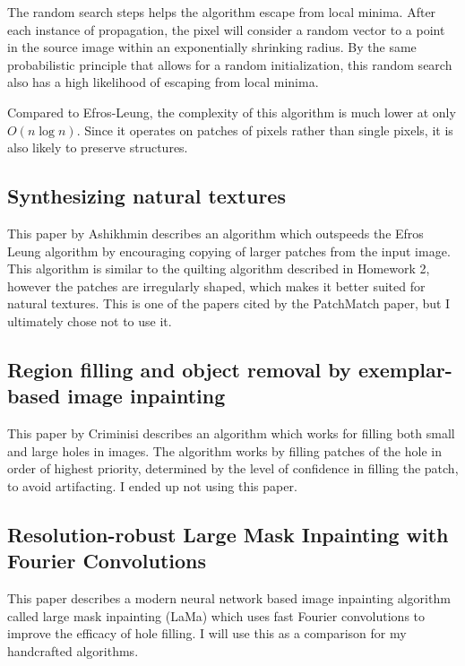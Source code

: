 The random search steps helps the algorithm escape from local minima. After each instance of propagation, the pixel will consider a random vector to a point in the source image within an exponentially shrinking radius. By the same probabilistic principle that allows for a random initialization, this random search also has a high likelihood of escaping from local minima.

Compared to Efros-Leung, the complexity of this algorithm is much lower at only $O(n\log n)$. Since it operates on patches of pixels rather than single pixels, it is also likely to preserve structures.
\subsection*{Synthesizing natural textures \cite{ashikhmin2001synthesizing}}
This paper by Ashikhmin describes an algorithm which outspeeds the Efros Leung algorithm by encouraging copying of larger patches from the input image. This algorithm is similar to the quilting algorithm described in Homework 2, however the patches are irregularly shaped, which makes it better suited for natural textures. This is one of the papers cited by the PatchMatch paper, but I ultimately chose not to use it.
\subsection*{Region filling and object removal by exemplar-based image inpainting \cite{criminisi2004region}}
This paper by Criminisi \etal describes an algorithm which works for filling both small and large holes in images. The algorithm works by filling patches of the hole in order of highest priority, determined by the level of confidence in filling the patch, to avoid artifacting. I ended up not using this paper.
\subsection*{Resolution-robust Large Mask Inpainting with Fourier Convolutions \cite{suvorov2022resolution}}
This paper describes a modern neural network based image inpainting algorithm called large mask inpainting (LaMa) which uses fast Fourier convolutions to improve the efficacy of hole filling. I will use this as a comparison for my handcrafted algorithms.